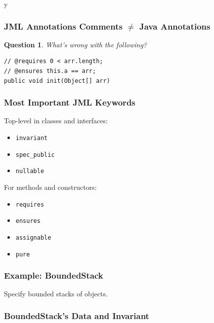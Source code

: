 \if y\MAKEHANDOUTS \documentclass[t,compress,landscape,handout]{beamer}
\newtheorem*{question}{Question}
\begin{document}
\begin{frame}[fragile]
\frametitle{JML Annotations Comments $\neq$ Java Annotations}
\begin{question}
What's wrong with the following?
\rm

\begin{lstlisting}
// @requires 0 < arr.length;
// @ensures this.a == arr;
public void init(Object[] arr)
\end{lstlisting}
\end{question}
\end{frame}

\begin{frame}
\frametitle{Most Important JML Keywords}

Top-level in classes and interfaces:
\begin{itemize}
\item
\lstinline!invariant!

\item
\lstinline!spec_public!

\item
\lstinline!nullable!
\end{itemize}

For methods and constructors:
\begin{itemize}
\item
\lstinline!requires!

\item
\lstinline!ensures!

\item
\lstinline!assignable!

\item
\lstinline!pure!
\end{itemize}
\end{frame}

\begin{frame}
\frametitle{Example: BoundedStack}

\begin{example}
Specify bounded stacks of objects.
\end{example}

\end{frame}

\begin{frame}[fragile]
\frametitle{BoundedStack's Data and Invariant}

\end{frame}
\end{document}
